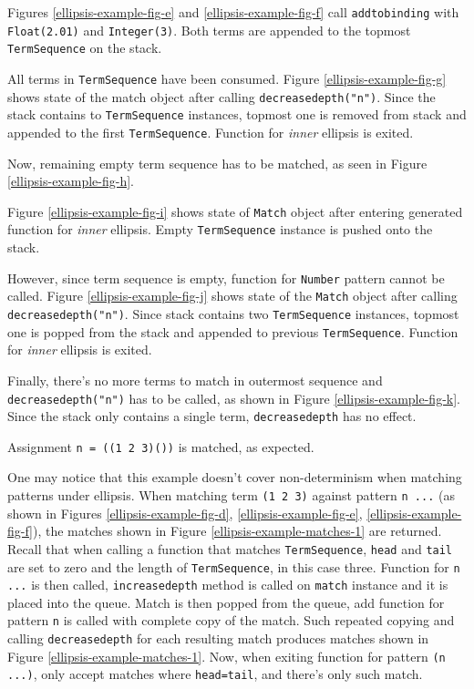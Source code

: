 Figures \ref{ellipsis-example-fig-e} and \ref{ellipsis-example-fig-f} call \texttt{addtobinding} with \texttt{Float(2.01)} and \texttt{Integer(3)}. Both terms are appended to the topmost \texttt{TermSequence} on the stack.

All terms in \texttt{TermSequence} have been consumed. Figure \ref{ellipsis-example-fig-g} shows state of the match object after calling \texttt{decreasedepth("n")}. Since the stack contains to \texttt{TermSequence} instances, topmost one is removed from stack and appended to the first \texttt{TermSequence}. Function for \textit{inner} ellipsis is exited.

Now, remaining empty term sequence has to be matched, as seen in Figure \ref{ellipsis-example-fig-h}.

Figure \ref{ellipsis-example-fig-i} shows state of \texttt{Match} object after entering generated function for \textit{inner} ellipsis. Empty \texttt{TermSequence} instance is pushed onto the stack.

However, since term sequence is empty, function for \texttt{Number} pattern cannot be called. Figure \ref{ellipsis-example-fig-j} shows state of the \texttt{Match} object after calling \texttt{decreasedepth("n")}. Since stack contains two \texttt{TermSequence} instances, topmost one is popped from the stack and appended to previous \texttt{TermSequence}. Function for \textit{inner} ellipsis is exited.

Finally, there's no more terms to match in outermost sequence and \texttt{decreasedepth("n")} has to be called, as shown in Figure \ref{ellipsis-example-fig-k}. Since the stack only contains a single term, \texttt{decreasedepth} has no effect.

Assignment \texttt{n = ((1 2 3)())} is matched, as expected.

One may notice that this example doesn't cover non-determinism when matching patterns under ellipsis. When matching term \texttt{(1 2 3)} against pattern \texttt{n ...} (as shown in Figures \ref{ellipsis-example-fig-d}, \ref{ellipsis-example-fig-e}, \ref{ellipsis-example-fig-f}), the matches shown in Figure \ref{ellipsis-example-matches-1} are returned. Recall that when calling a function that matches \texttt{TermSequence}, \texttt{head} and \texttt{tail} are set to zero and the length of \texttt{TermSequence}, in this case three. Function for \texttt{n ...} is then called, \texttt{increasedepth} method is called on \texttt{match} instance and it is placed into the queue. Match is then popped from the queue, add function for pattern \texttt{n} is called with complete copy of the match. Such repeated copying and calling \texttt{decreasedepth} for each resulting match produces matches shown in Figure \ref{ellipsis-example-matches-1}. Now, when exiting function for pattern \texttt{(n ...)}, only accept matches where \texttt{head=tail}, and there's only such match.

